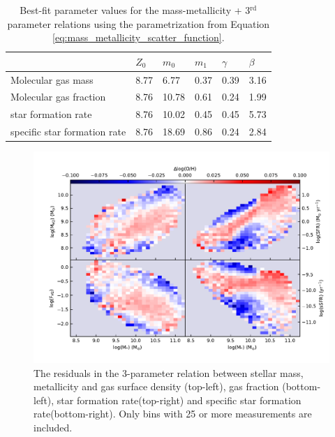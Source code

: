 \documentclass[fleqn,usenatbib]{mnras}
\begin{document}
\begin{table}
 \centering
 \caption{Best-fit parameter values for the mass-metallicity + 3$^{\textrm{rd}}$ parameter relations using the parametrization from Equation \ref{eq:mass_metallicity_scatter_function}.}
 \label{tab:mzr_best_fits}
\begin{tabular}{llllll}
\hline
\hline
                   & \textbf{$Z_0$} & \textbf{$m_0$} & \textbf{$m_1$} & \textbf{$\gamma$} & \textbf{$\beta$} \\ \hline
Molecular gas mass            & 8.77           & 6.77           & 0.37           & 0.39              & 3.16             \\
Molecular gas fraction        & 8.76           & 10.78          & 0.61           & 0.24              & 1.99             \\
star formation rate           & 8.76           & 10.02          & 0.45           & 0.45              & 5.73             \\
specific star formation rate  & 8.76           & 18.69          & 0.86           & 0.24              & 2.84             \\
\hline
\end{tabular}
\end{table}

\begin{figure}
    \centering
    \includegraphics[width=2\columnwidth]{figures/fig12.pdf}
    \caption{The residuals in the 3-parameter relation between stellar mass, metallicity and gas surface density (top-left), gas fraction (bottom-left), star formation rate(top-right) and specific star formation rate(bottom-right). Only bins with 25 or more measurements are included.}
    \label{fig:MZR_binned_metallicity_residuals}
\end{figure}
\end{document}
